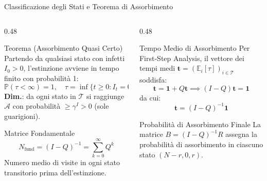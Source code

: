 \documentclass[10pt, aspectratio=169]{beamer}
\begin{document}
\begin{frame}{Classificazione degli Stati e Teorema di Assorbimento}
    \begin{columns}[T]
        \begin{column}{0.48\textwidth}
            \begin{alertblock}{Teorema (Assorbimento Quasi Certo)}
                Partendo da qualsiasi stato con infetti $I_0 > 0$, l'estinzione avviene in tempo finito con probabilità 1:
                \[ \mathbb{P}(\tau < \infty) = 1, \quad \tau = \inf\{t \ge 0 : I_t = 0\} \]
                \footnotesize \textbf{Dim.}: da ogni stato in $\mathcal{T}$ si raggiunge $\mathcal{A}$ con probabilità $\ge \gamma^I > 0$ (sole guarigioni).
            \end{alertblock}
            \vspace{0.05cm}
            \begin{block}{\footnotesize Matrice Fondamentale}
                \[ N_{\text{fund}} = (I - Q)^{-1} = \sum_{k=0}^\infty Q^k \]
                \footnotesize Numero medio di visite in ogni stato transitorio prima dell'estinzione.
            \end{block}
        \end{column}
        \begin{column}{0.48\textwidth}
            \begin{block}{Tempo Medio di Assorbimento}
                Per First-Step Analysis, il vettore dei tempi medi $\mathbf{t} = (\mathbb{E}_i[\tau])_{i \in \mathcal{T}}$ soddisfa:
                \[ \mathbf{t} = \mathbf{1} + Q \mathbf{t} \implies (I - Q)\mathbf{t} = \mathbf{1} \]
                da cui:
                \[ \mathbf{t} = (I - Q)^{-1}\mathbf{1} \]
            \end{block}
            \begin{block}{\footnotesize Probabilità di Assorbimento Finale}
                La matrice $B = (I - Q)^{-1} R$ assegna la probabilità di assorbimento in ciascuno stato $(N-r, 0, r)$.
            \end{block}
        \end{column}
    \end{columns}

\end{frame}
\end{document}
